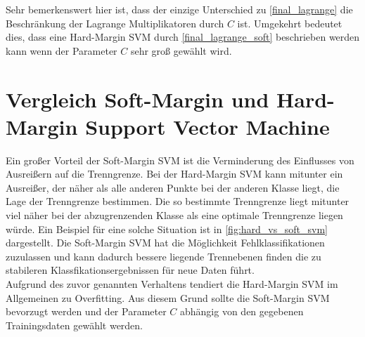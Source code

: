 \documentclass[a4paper,11pt,twoside]{scrreprt}
\begin{document}
Sehr bemerkenswert hier ist, dass der einzige Unterschied zu \autoref{final_lagrange} die Beschränkung der Lagrange Multiplikatoren durch $C$ ist. Umgekehrt bedeutet dies, dass eine Hard-Margin SVM durch \autoref{final_lagrange_soft} beschrieben werden kann wenn der Parameter $C$ sehr groß gewählt wird. \\

\chapter{Vergleich Soft-Margin und Hard-Margin Support Vector Machine}

Ein großer Vorteil der Soft-Margin \ac{SVM} ist die Verminderung des Einflusses von Ausreißern auf die Trenngrenze. Bei der Hard-Margin \ac{SVM} kann mitunter ein Ausreißer, der näher als alle anderen Punkte bei der anderen Klasse liegt, die Lage der Trenngrenze bestimmen. Die so bestimmte Trenngrenze liegt mitunter viel näher bei der abzugrenzenden Klasse als eine optimale Trenngrenze liegen würde. Ein Beispiel für eine solche Situation ist in \autoref{fig:hard_vs_soft_svm} dargestellt. Die Soft-Margin \ac{SVM} hat die Möglichkeit Fehlklassifikationen zuzulassen und kann dadurch bessere liegende Trennebenen finden die zu stabileren Klassfikationsergebnissen für neue Daten führt.\\

Aufgrund des zuvor genannten Verhaltens tendiert die Hard-Margin \ac{SVM} im Allgemeinen zu Overfitting. Aus diesem Grund sollte die Soft-Margin \ac{SVM} bevorzugt werden und der Parameter $C$ abhängig von den gegebenen Trainingsdaten gewählt werden.
\end{document}
